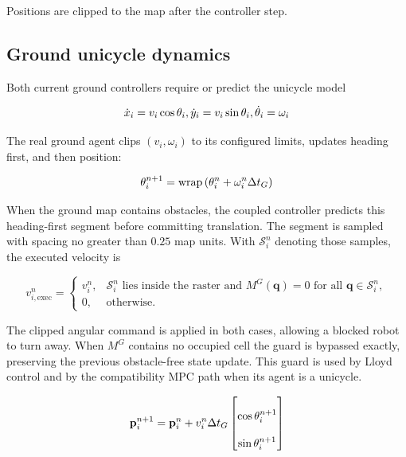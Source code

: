 \documentclass[11pt]{article}
\begin{document}
Positions are clipped to the map after the controller step.


\subsection{Ground unicycle dynamics}


Both current ground controllers require or predict the unicycle model


\begin{equation}
\dot x_i=v_i\cos\theta_i, \\
\qquad \\
\dot y_i=v_i\sin\theta_i, \\
\qquad \\
\dot\theta_i=\omega_i
\end{equation}


The real ground agent clips $(v_i,\omega_i)$ to its configured limits, updates heading first, and then position:


\begin{equation}
\theta_i^{n+1} \\
= \\
\mathrm{wrap} \\
\left(\theta_i^n+\omega_i^n\Delta t_G\right)
\end{equation}


When the ground map contains obstacles, the coupled controller predicts this heading-first segment before committing translation. The segment is sampled with spacing no greater than $0.25$ map units. With $\mathcal S_i^n$ denoting those samples, the executed velocity is


\begin{equation}
v_{i,\mathrm{exec}}^n
=
\begin{cases}
v_i^n,
& \mathcal S_i^n\text{ lies inside the raster and }M^G(\mathbf q)=0
\text{ for all }\mathbf q\in\mathcal S_i^n,\\
0,&\text{otherwise}.
\end{cases}
\end{equation}


The clipped angular command is applied in both cases, allowing a blocked robot to turn away. When $M^G$ contains no occupied cell the guard is bypassed exactly, preserving the previous obstacle-free state update. This guard is used by Lloyd control and by the compatibility MPC path when its agent is a unicycle.


\begin{equation}
\mathbf p_i^{n+1} \\
= \\
\mathbf p_i^n \\
+ \\
v_i^n\Delta t_G \\
\begin{bmatrix} \\
\cos\theta_i^{n+1}\\ \\
\sin\theta_i^{n+1} \\
\end{bmatrix}
\end{equation}
\end{document}
